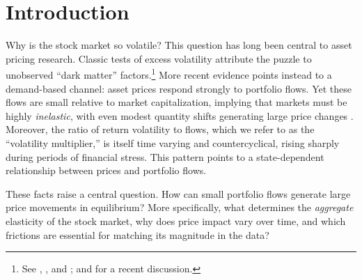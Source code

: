 \documentclass[12pt,english]{article}
\begin{document}





\newpage
\onehalfspacing
\setcounter{page}{1}
	
\newpage
\onehalfspacing
\setcounter{page}{1}

\section{Introduction}\label{sec:intro}
\noindent Why is the stock market so volatile?
This question has long been central to asset pricing research.
Classic tests of excess volatility attribute the puzzle to unobserved ``dark matter'' factors.\footnote{See \citet{leroy1981present}, \citet{shiller1981,shiller1992market}, and \citet{cochrane1992explaining}; and \citet{chen2024measuring} for a recent discussion.}
More recent evidence points instead to a demand-based channel: asset prices respond strongly to portfolio flows.
Yet these flows are small relative to market capitalization, implying that markets must be highly \emph{inelastic}, with even modest quantity shifts generating large price changes \citep{gabaix2020search}.
Moreover, the ratio of return volatility to flows, which we refer to as the ``volatility multiplier,'' is itself time varying and countercyclical, rising sharply during periods of financial stress.
This pattern points to a state-dependent relationship between prices and portfolio flows.

These facts raise a central question.
How can small portfolio flows generate large price movements in equilibrium?
More specifically, what determines the \emph{aggregate} elasticity of the stock market, why does price impact vary over time, and which frictions are essential for matching its magnitude in the data?
\end{document}
